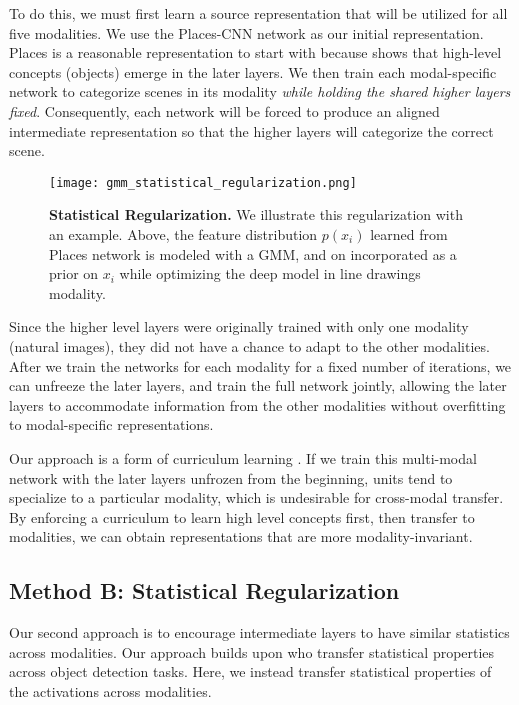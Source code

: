 \documentclass[10pt,journal,compsoc]{IEEEtran}
\begin{document}
    To do this, we must first learn a source representation that will be utilized for all five modalities. We use the Places-CNN network as our initial representation. Places is a reasonable representation to start with because \cite{zhou2014object} shows that high-level concepts (objects) emerge in the later layers. We then train each modal-specific network to categorize scenes in its modality \emph{while holding the shared higher layers fixed}. Consequently, each network will be forced to produce an aligned intermediate representation so that the higher layers will categorize the correct scene.
    
     \begin{figure}
         \centering
         \texttt{[image: gmm\_statistical\_regularization.png]}
         \caption{ { \bf Statistical Regularization.} We illustrate this regularization with an example. Above, the feature distribution $p(x_i)$ learned from Places network is modeled with a GMM, and on incorporated as a prior on $x_i$ while optimizing the deep model in line drawings modality.}
         \label{fig:gmm_regularization}
     \end{figure}
    
    		
    
    Since the higher level layers were originally trained with only one modality (natural images), they did not have a chance to adapt to the other modalities. After we train the networks for each modality for a fixed number of iterations, we can unfreeze the later layers, and train the full network jointly, allowing the later layers to accommodate information from the other modalities without overfitting to modal-specific representations.
    
    Our approach is a form of curriculum learning \cite{bengio2009curriculum}. If we train this multi-modal network with the later layers unfrozen from the beginning, units tend to specialize to a particular modality, which is undesirable for cross-modal transfer. By enforcing a curriculum to learn high level concepts first, then transfer to modalities, we can obtain representations that are more modality-invariant.


    \subsection{Method B: Statistical Regularization} 
    
    Our second approach is to encourage intermediate layers to have similar statistics across modalities. Our approach builds upon \cite{gao2012makes,Aytar15} who transfer statistical properties across object detection tasks. Here, we instead transfer statistical properties of the activations across modalities. 
    
\end{document}
